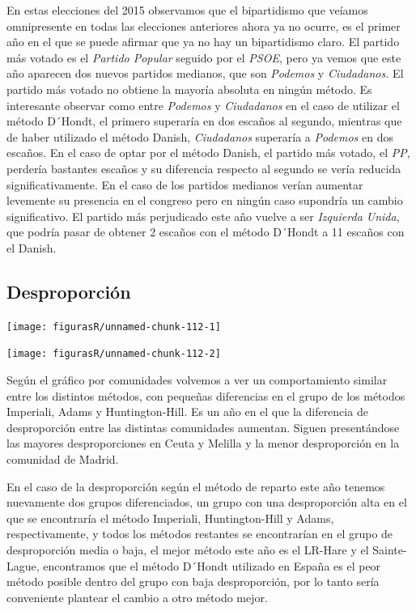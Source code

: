 \documentclass[12pt,a4paper,]{book}
\numberwithin{dummy}{section}
\theoremstyle{ocrenumbox}
\theoremstyle{blacknumex}
\theoremstyle{blacknumbox}
\theoremstyle{ocrenum}
\theoremstyle{ocrenum}
\begin{document}
En estas elecciones del 2015 observamos que el bipartidismo que veíamos
omnipresente en todas las elecciones anteriores ahora ya no ocurre, es
el primer año en el que se puede afirmar que ya no hay un bipartidismo
claro. El partido más votado es el \emph{Partido Popular} seguido por el
\emph{PSOE}, pero ya vemos que este año aparecen dos nuevos partidos
medianos, que son \emph{Podemos} y \emph{Ciudadanos.} El partido más
votado no obtiene la mayoría absoluta en ningún método. Es interesante
observar como entre \emph{Podemos} y \emph{Ciudadanos} en el caso de
utilizar el método D´Hondt, el primero superaría en dos escaños al
segundo, mientras que de haber utilizado el método Danish,
\emph{Ciudadanos} superaría a \emph{Podemos} en dos escaños. En el caso
de optar por el método Danish, el partido más votado, el \emph{PP},
perdería bastantes escaños y su diferencia respecto al segundo se vería
reducida significativamente. En el caso de los partidos medianos verían
aumentar levemente su presencia en el congreso pero en ningún caso
supondría un cambio significativo. El partido más perjudicado este año
vuelve a ser \emph{Izquierda Unida}, que podría pasar de obtener 2
escaños con el método D´Hondt a 11 escaños con el Danish.

\hypertarget{desproporciuxf3n-11}{%
\subsection{Desproporción}\label{desproporciuxf3n-11}}

\begin{center}\texttt{[image: figurasR/unnamed-chunk-112-1]} \end{center}

\begin{center}\texttt{[image: figurasR/unnamed-chunk-112-2]} \end{center}

Según el gráfico por comunidades volvemos a ver un comportamiento
similar entre los distintos métodos, con pequeñas diferencias en el
grupo de los métodos Imperiali, Adams y Huntington-Hill. Es un año en el
que la diferencia de desproporción entre las distintas comunidades
aumentan. Siguen presentándose las mayores desproporciones en Ceuta y
Melilla y la menor desproporción en la comunidad de Madrid.

En el caso de la desproporción según el método de reparto este año
tenemos nuevamente dos grupos diferenciados, un grupo con una
desproporción alta en el que se encontraría el método Imperiali,
Huntington-Hill y Adams, respectivamente, y todos los métodos restantes
se encontrarían en el grupo de desproporción media o baja, el mejor
método este año es el LR-Hare y el Sainte-Lague, encontramos que el
método D´Hondt utilizado en España es el peor método posible dentro del
grupo con baja desproporción, por lo tanto sería conveniente plantear el
cambio a otro método mejor.
\end{document}
